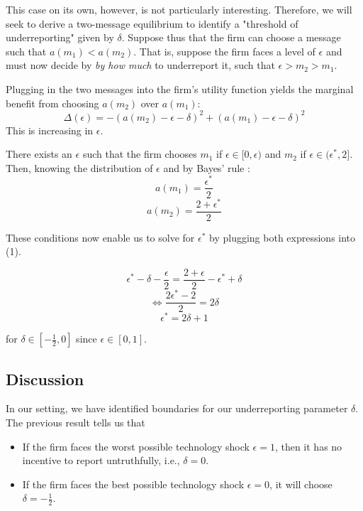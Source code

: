 \documentclass{article}
\begin{document}
This case on its own, however, is not particularly interesting. Therefore, we will seek to derive a two-message equilibrium to identify a "threshold of underreporting" given by $\delta$. Suppose thus that the firm can choose a message such that $a(m_1) < a(m_2)$. That is, suppose the firm faces a level of $\epsilon$ and must now decide by \textit{by how much} to underreport it, such that $\epsilon > m_2 > m_1$.

Plugging in the two messages into the firm's utility function yields the marginal benefit from choosing $a(m_2)$ over $a(m_1)$:
\begin{equation}
    \Delta(\epsilon) = - (a(m_2) - \epsilon - \delta)^2 + (a(m_1) - \epsilon - \delta)^2
\end{equation}
This is increasing in $\epsilon$.

\begin{proposition}
    There exists an $\epsilon$ such that the firm chooses $m_1$ if $\epsilon \in [0, \epsilon)$ and $m_2$ if $\epsilon \in (\epsilon^{*}, 2]$. Then, knowing the distribution of $\epsilon$ and by Bayes' rule :
    \begin{equation*}
        a(m_1) = \frac{\epsilon^*}{2}
    \end{equation*}
    \begin{equation*}
        a(m_2) = \frac{2 + \epsilon^*}{2}
    \end{equation*}
\end{proposition}
\vspace{5mm}
These conditions now enable us to solve for $\epsilon^*$ by plugging both expressions into (1).

$$\epsilon^{*} - \delta - \frac{\epsilon}{2} = \frac{2 + \epsilon}{2} - \epsilon^{*} + \delta$$
$$\Leftrightarrow\frac{2\epsilon^* - 2}{2} = 2\delta $$
\begin{equation}
    \epsilon^* = 2\delta + 1
\end{equation}

for $\delta \in [- \frac{1}{2}, 0]$ since $\epsilon \in [0,1]$.

\subsection{Discussion}

In our setting, we have identified boundaries for our underreporting parameter $\delta$. The previous result tells us that
\begin{itemize}
    \item If the firm faces the worst possible technology shock $\epsilon = 1$, then it has no incentive to report untruthfully, i.e., $\delta = 0$.
    \item If the firm faces the best possible technology shock $\epsilon = 0$, it will choose $\delta = - \frac{1}{2}$. 
\end{itemize}
\pagebreak
\end{document}
